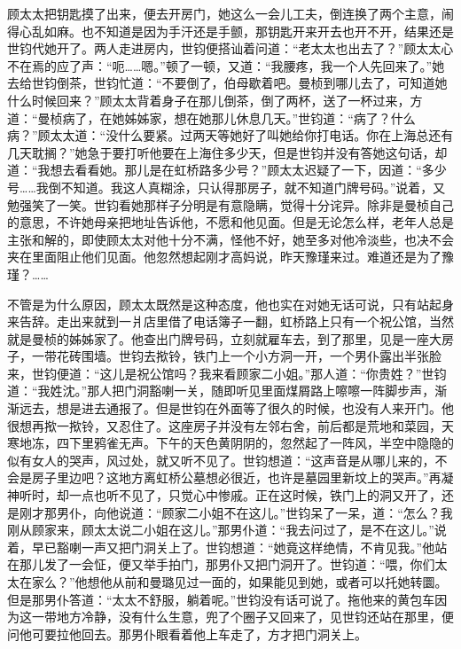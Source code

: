 \par 顾太太把钥匙摸了出来，便去开房门，她这么一会儿工夫，倒连换了两个主意，闹得心乱如麻。也不知道是因为手汗还是手颤，那钥匙开来开去也开不开，结果还是世钧代她开了。两人走进房内，世钧便搭讪着问道：“老太太也出去了？”顾太太心不在焉的应了声：“呃……嗯。”顿了一顿，又道：“我腰疼，我一个人先回来了。”她去给世钧倒茶，世钧忙道：“不要倒了，伯母歇着吧。曼桢到哪儿去了，可知道她什么时候回来？”顾太太背着身子在那儿倒茶，倒了两杯，送了一杯过来，方道：“曼桢病了，在她姊姊家，想在她那儿休息几天。”世钧道：“病了？什么病？”顾太太道：“没什么要紧。过两天等她好了叫她给你打电话。你在上海总还有几天耽搁？”她急于要打听他要在上海住多少天，但是世钧并没有答她这句话，却道：“我想去看看她。那儿是在虹桥路多少号？”顾太太迟疑了一下，因道：“多少号……我倒不知道。我这人真糊涂，只认得那房子，就不知道门牌号码。”说着，又勉强笑了一笑。世钧看她那样子分明是有意隐瞒，觉得十分诧异。除非是曼桢自己的意思，不许她母亲把地址告诉他，不愿和他见面。但是无论怎么样，老年人总是主张和解的，即使顾太太对他十分不满，怪他不好，她至多对他冷淡些，也决不会夹在里面阻止他们见面。他忽然想起刚才高妈说，昨天豫瑾来过。难道还是为了豫瑾？……
\par 不管是为什么原因，顾太太既然是这种态度，他也实在对她无话可说，只有站起身来告辞。走出来就到一爿店里借了电话簿子一翻，虹桥路上只有一个祝公馆，当然就是曼桢的姊姊家了。他查出门牌号码，立刻就雇车去，到了那里，见是一座大房子，一带花砖围墙。世钧去揿铃，铁门上一个小方洞一开，一个男仆露出半张脸来，世钧便道：“这儿是祝公馆吗？我来看顾家二小姐。”那人道：“你贵姓？”世钧道：“我姓沈。”那人把门洞豁喇一关，随即听见里面煤屑路上嚓嚓一阵脚步声，渐渐远去，想是进去通报了。但是世钧在外面等了很久的时候，也没有人来开门。他很想再揿一揿铃，又忍住了。这座房子并没有左邻右舍，前后都是荒地和菜园，天寒地冻，四下里鸦雀无声。下午的天色黄阴阴的，忽然起了一阵风，半空中隐隐的似有女人的哭声，风过处，就又听不见了。世钧想道：“这声音是从哪儿来的，不会是房子里边吧？这地方离虹桥公墓想必很近，也许是墓园里新坟上的哭声。”再凝神听时，却一点也听不见了，只觉心中惨戚。正在这时候，铁门上的洞又开了，还是刚才那男仆，向他说道：“顾家二小姐不在这儿。”世钧呆了一呆，道：“怎么？我刚从顾家来，顾太太说二小姐在这儿。”那男仆道：“我去问过了，是不在这儿。”说着，早已豁喇一声又把门洞关上了。世钧想道：“她竟这样绝情，不肯见我。”他站在那儿发了一会怔，便又举手拍门，那男仆又把门洞开了。世钧道：“喂，你们太太在家么？”他想他从前和曼璐见过一面的，如果能见到她，或者可以托她转圜。但是那男仆答道：“太太不舒服，躺着呢。”世钧没有话可说了。拖他来的黄包车因为这一带地方冷静，没有什么生意，兜了个圈子又回来了，见世钧还站在那里，便问他可要拉他回去。那男仆眼看着他上车走了，方才把门洞关上。
